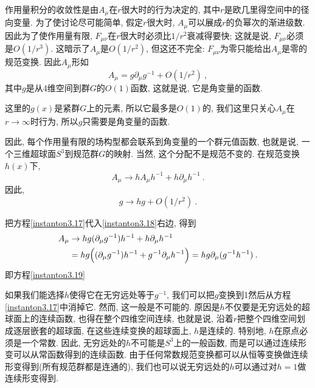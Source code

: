 作用量积分的收敛性是由$A_{\mu}$在$r$很大时的行为决定的, 其中$r$是欧几里得空间中的径向变量. 为了使讨论尽可能简单, 假定$r$很大时, $A_{\mu}$可以展成$r$的负幂次的渐进级数. 因此为了使作用量有限, $F_{\mu\nu}$在$r$很大时必须比$1/r^{2}$衰减得要快; 这就是说, $F_{\mu\nu}$必须是$O(1/r^{3})$. 这暗示了$A_{\mu}$是$O(1/r^{2})$, 但这还不完全: $F_{\mu\nu}$为零只能给出$A_{\mu}$是零的规范变换. 因此$A_{\mu}$形如
\begin{equation}
    A_{\mu} = g \partial_{\mu} g^{-1} + O(1/r^{2}) \:, \label{instanton3.17}
\end{equation}
其中$g$是从4维空间到群$G$的$O(1)$函数, 这就是说, 它是角变量的函数.

\begin{remark}
这里的$g(x)$是紧群$G$上的元素, 所以它最多是$O(1)$的, 我们这里只关心$A_{\mu}$在$r\to\infty$时行为, 所以$g$只需要是角变量的函数.    
\end{remark}

因此, 每个作用量有限的场构型都会联系到角变量的一个群元值函数, 也就是说, 一个三维超球面$S^{3}$到规范群$G$的映射. 当然, 这个分配不是规范不变的. 在规范变换$h(x)$下,
\begin{equation}
    A_{\mu } \to h A_{\mu}h^{-1} + h \partial_{\mu}h^{-1} \:. \label{instanton3.18}
\end{equation}
因此,
\begin{equation}
    g\to hg + O(1/r^{2}) \:. \label{instanton3.19}
\end{equation}
\begin{tcolorbox}
    把方程\eqref{instanton3.17}代入\eqref{instanton3.18}右边, 得到
    \begin{align*}
        A_{\mu} &\to hg(\partial_{\mu}g^{-1})h^{-1} +h\partial_{\mu}h^{-1} \\
        &= hg \Bigl( (\partial_{\mu}g^{-1})h^{-1} +g^{-1}\partial_{\mu}h^{-1}\Bigr) =hg \partial_{\mu} (g^{-1}h^{-1}) \:. 
    \end{align*}
    即方程\eqref{instanton3.19}
\end{tcolorbox}

如果我们能选择$h$使得它在无穷远处等于$g^{-1}$, 我们可以把$g$变换到1然后从方程\eqref{instanton3.17}中消掉它. 然而, 这一般是不可能的. 
原因是$h$不仅要是无穷远处的超球面上的连续函数, 也得在整个四维空间连续, 也就是说, 沿着$r$把整个四维空间划成逐层嵌套的超球面, 在这些连续变换的超球面上, $h$是连续的. 特别地, $h$在原点必须是一个常数. 因此, 无穷远处的$h$不可能是$S^{3}$上的一般函数, 而是可以通过连续形变可以从常函数得到的连续函数. 由于任何常数规范变换都可以从恒等变换做连续形变得到(所有规范群都是连通的), 我们也可以说无穷远处的$h$可以通过对$h=1$做连续形变得到.

